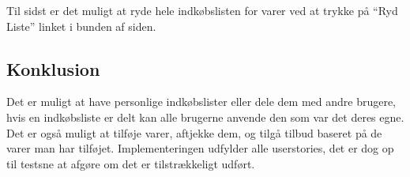 Til sidst er det muligt at ryde hele indkøbslisten for varer ved at trykke på ``Ryd Liste'' linket i bunden af siden.
\subsection{Konklusion}
Det er muligt at have personlige indkøbslister eller dele dem med andre brugere, hvis en indkøbsliste er delt kan alle brugerne anvende den som var det deres egne. 
Det er også muligt at tilføje varer, aftjekke dem, og tilgå tilbud baseret på de varer man har tilføjet. 
Implementeringen udfylder alle userstories, det er dog op til testsne at afgøre om det er tilstrækkeligt udført. 
